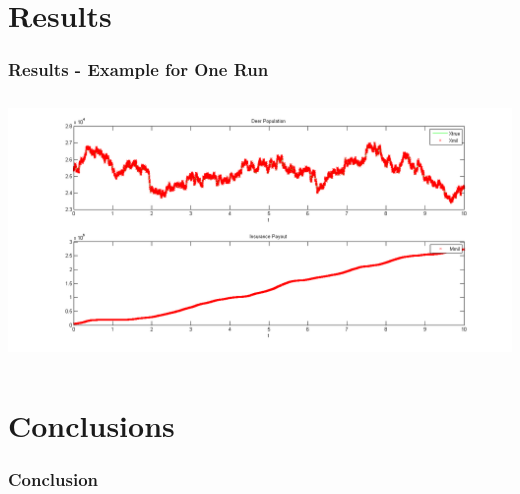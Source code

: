 



\section{Results}

\begin{frame}
    \frametitle{Results - Example for One Run}
\hspace*{-2cm}
\includegraphics[height=7cm]{deerins}
\end{frame}






\section{Conclusions}

\begin{frame}
    \frametitle{Conclusion}
\end{frame}




